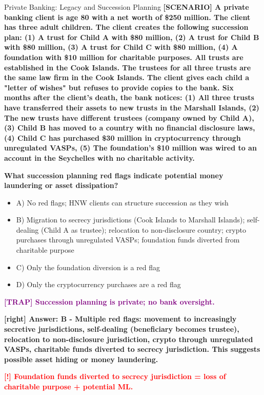 \documentclass[11pt,a4paper]{beamer}
\newcommand{\redflag}[1]{\textcolor{red}{\textbf{[!] #1}}}
\newcommand{\trap}[1]{\textcolor{purple}{\textbf{[TRAP] #1}}}
\newcommand{\correct}[1]{\textcolor{green!50!black}{\textbf{[right] #1}}}
\newcommand{\scenario}[1]{\textcolor{blue!70!black}{\textbf{[SCENARIO] #1}}}
\begin{document}
	
	\begin{frame}{Private Banking: Legacy and Succession Planning}
		\tiny
		\scenario{A private banking client is age 80 with a net worth of \$250 million. The client has three adult children. The client creates the following succession plan: (1) A trust for Child A with \$80 million, (2) A trust for Child B with \$80 million, (3) A trust for Child C with \$80 million, (4) A foundation with \$10 million for charitable purposes. All trusts are established in the Cook Islands. The trustees for all three trusts are the same law firm in the Cook Islands. The client gives each child a "letter of wishes" but refuses to provide copies to the bank. Six months after the client's death, the bank notices: (1) All three trusts have transferred their assets to new trusts in the Marshall Islands, (2) The new trusts have different trustees (company owned by Child A), (3) Child B has moved to a country with no financial disclosure laws, (4) Child C has purchased \$30 million in cryptocurrency through unregulated VASPs, (5) The foundation's \$10 million was wired to an account in the Seychelles with no charitable activity.}
		
		\vspace{0.02cm}
		\textbf{What succession planning red flags indicate potential money laundering or asset dissipation?}
		\vspace{0.02cm}
		
		\begin{itemize}
			\item A) No red flags; HNW clients can structure succession as they wish
			\item B) Migration to secrecy jurisdictions (Cook Islands to Marshall Islands); self-dealing (Child A as trustee); relocation to non-disclosure country; crypto purchases through unregulated VASPs; foundation funds diverted from charitable purpose
			\item C) Only the foundation diversion is a red flag
			\item D) Only the cryptocurrency purchases are a red flag
		\end{itemize}
		
		\vspace{0.02cm}
		\trap{Succession planning is private; no bank oversight.}
		
		\vspace{0.02cm}
		\correct{Answer: B - Multiple red flags: movement to increasingly secretive jurisdictions, self-dealing (beneficiary becomes trustee), relocation to non-disclosure jurisdiction, crypto through unregulated VASPs, charitable funds diverted to secrecy jurisdiction. This suggests possible asset hiding or money laundering.}
		
		\vspace{0.02cm}
		\redflag{Foundation funds diverted to secrecy jurisdiction = loss of charitable purpose + potential ML.}
	\end{frame}
	
\end{document}
